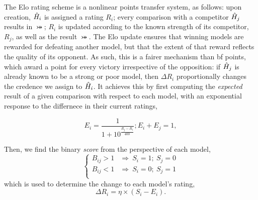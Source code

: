 The \gls{Elo rating} scheme is a nonlinear points transfer system, as follows: 
    upon creation, $\hat{H}_i$ is assigned a rating $R_i$; 
    every comparison with a competitor $\hat{H}_j$ results in $\bij$; 
    $R_i$ is updated according to the known strength of its competitor, $R_j$, 
    as well as the result $\bij$. 
The Elo update ensures that winning models are rewarded 
    for defeating another model, 
    but that the extent of that reward reflects the quality of its opponent. 
As such, this is a fairer mechanism than \gls{bf} points, 
    which award a point for every victory irrespective of the opposition:
    if $\hat{H}_j$ is already known to be a strong or poor model, 
    then $\Delta R_i$ proportionally changes the credence we assign to $\hat{H}_i$. 
It achieves this by first computing the \emph{expected} result of a given comparison
    with respect to each model, with an exponential response to the differnece in their current ratings, 

\begin{subequations}
    \label{eqn:elo_expected_score}
    \begin{equation}
        E_i 
        = \frac{1}{1 + 10^{\frac{R_j - R_i}{400}}} ;
    \end{equation}
    \begin{equation}
        E_i + E_j = 1,
    \end{equation}    
\end{subequations}

Then, we find the binary \emph{score} from the perspective of each model,
\begin{equation}
    \label{eqn:elo_score}
    \begin{cases}
        B_{ij} > 1 & \Rightarrow \ S_i = 1; \ S_j =0  \\
        B_{ij} < 1 & \Rightarrow \ S_i = 0; \ S_j = 1 \\
    \end{cases}
\end{equation}
which is used to determine the change to each model's rating,
\begin{equation}
    \label{eqn:elo_delta_r}
    \Delta R_i = \eta \times \left( S_i - E_i \right).
\end{equation}

